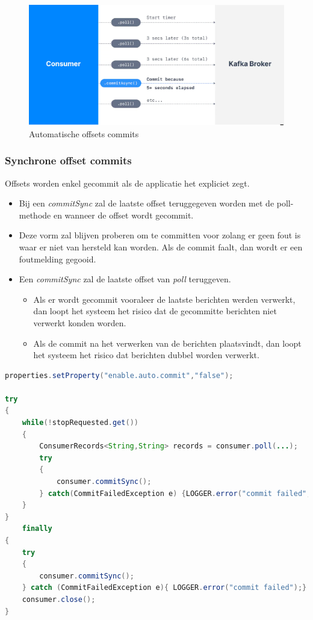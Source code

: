 \documentclass[a4paper,10pt,twoside]{report}
\begin{document}
\begin{figure}
	\includegraphics[width=\linewidth]{images/kafka-automatic-commit.png}
	\caption{Automatische offsets commits}
\end{figure}

\subsubsection{Synchrone offset commits}

Offsets worden enkel gecommit als de applicatie het expliciet zegt. 

\begin{itemize}
	\item Bij een \textit{commitSync} zal de laatste offset teruggegeven worden met de poll-methode en wanneer de offset wordt gecommit.
	\item Deze vorm zal blijven proberen om te committen voor zolang er geen fout is waar er niet van hersteld kan worden. Als de commit faalt, dan wordt er een foutmelding gegooid.
	\item Een \textit{commitSync} zal de laatste offset van \textit{poll} teruggeven. 
	\begin{itemize}
		\item Als er wordt gecommit vooraleer de laatste berichten werden verwerkt, dan loopt het systeem het risico dat de gecommitte berichten niet verwerkt konden worden.
		\item Als de commit na het verwerken van de berichten plaatsvindt, dan loopt het systeem het risico dat berichten dubbel worden verwerkt.
	\end{itemize}
\end{itemize}

\begin{lstlisting}[language=Java]
properties.setProperty("enable.auto.commit","false");

try
{
	while(!stopRequested.get())
	{
		ConsumerRecords<String,String> records = consumer.poll(...);
		try 
		{
			consumer.commitSync();
		} catch(CommitFailedException e) {LOGGER.error("commit failed", e);}
	}
} 
	finally 
{
	try
	{
		consumer.commitSync();
	} catch (CommitFailedException e){ LOGGER.error("commit failed");}
	consumer.close();
}
\end{lstlisting}
\end{document}
